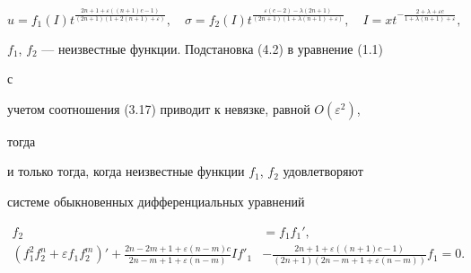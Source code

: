 \begin{equation}


u=f_1(I)t^{\frac{2n+1+\varepsilon((n+1)c-1)}


{(2n+1)(1+2(n+1)+\varepsilon)}},\quad


\sigma=f_2(I)t^{\frac{\varepsilon(c-2)-\lambda(2n+1)}


{(2n+1)(1+\lambda(n+1)+\varepsilon)}},\quad


I=xt^{-\frac{2+\lambda+\varepsilon c}


{1+\lambda(n+1)+\varepsilon}},


\tag{4.2}


\end{equation}


$f_1$, $f_2$ --- неизвестные функции. Подстановка (4.2) в уравнение (1.1)


с


учетом соотношения (3.17) приводит к невязке, равной $O(\varepsilon^2)$,


тогда


и только тогда, когда неизвестные функции $f_1$, $f_2$ удовлетворяют


системе обыкновенных дифференциальных уравнений


\begin{equation}


\begin{split}


f_2&=f_1f_1',\\


(f^2_1f^n_2+\varepsilon f_1 f^m_2)'+


\frac{2n-2m+1+\varepsilon(n-m)c}{2n-m+1+\varepsilon(n-m)}If'_1 &-


\frac{2n+1+\varepsilon((n+1)c-1)}{(2n+1)(2n-m+1+\varepsilon(n-m))}


f_1=0.


\end{split}


\tag{4.3}


\end{equation}






